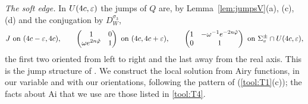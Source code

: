 \emph{The soft edge.} In $U(4c,\varepsilon)$ the jumps of $Q$ are, by Lemma~\ref{lem:jumpsV}(a), (c), (d) and the conjugation
by $D_W^{\sigma_3}$,
\begin{equation}\label{eq:jumps-4c}
  J\ \text{on }(4c-\eps,4c),\qquad
  \begin{pmatrix}1&0\\\omega e^{2n\tvphi}&1\end{pmatrix}\ \text{on }(4c,4c+\eps),\qquad
  \begin{pmatrix}1&-\omega^{-1}e^{-2n\tvphi}\\0&1\end{pmatrix}\ \text{on }\Sigma^\pm_v\cap U(4c,\eps),
\end{equation}
the first two oriented from left to right and the last away from the real axis. This is the jump structure of
\cite[(6.4)]{WLXZ}. We construct the local solution from Airy functions, in our variable and with our orientations,
following the pattern of \cite[(6.10)--(6.12)]{WLXZ} (\ref{tool:T1}(c)); the facts about $\mathrm{Ai}$ that we use are
those listed in \ref{tool:T4}.

